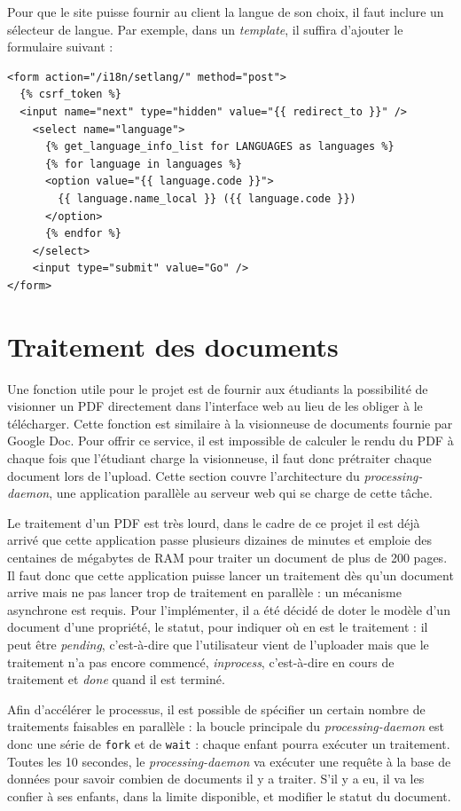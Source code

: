 \documentclass[a4paper,12pt]{article}
\begin{document}
Pour que le site puisse fournir au client la langue de son choix, il faut inclure
un sélecteur de langue. Par exemple, dans un \textit{template}, il suffira d'ajouter
le formulaire suivant : 

\begin{verbatim}
<form action="/i18n/setlang/" method="post">
  {% csrf_token %}
  <input name="next" type="hidden" value="{{ redirect_to }}" />
    <select name="language">
      {% get_language_info_list for LANGUAGES as languages %}
      {% for language in languages %}
      <option value="{{ language.code }}">
        {{ language.name_local }} ({{ language.code }})
      </option>
      {% endfor %}
    </select>
    <input type="submit" value="Go" />
</form>
\end{verbatim}


\section{Traitement des documents}

Une fonction utile pour le projet est de fournir aux étudiants la possibilité
de visionner un PDF directement dans l'interface web au lieu de les obliger
à le télécharger. Cette fonction est similaire à la visionneuse de documents fournie
par Google Doc. Pour offrir ce service, il est impossible de calculer le rendu du PDF
à chaque fois que l'étudiant charge la visionneuse, il faut donc prétraiter chaque
document lors de l'upload. Cette section couvre l'architecture du \textit{processing-daemon},
une application parallèle au serveur web qui se charge de cette tâche.

Le traitement d'un PDF est très lourd, dans le cadre de ce projet il est déjà
arrivé que cette application passe plusieurs dizaines de minutes et emploie des centaines
de mégabytes de RAM pour traiter un document de plus de 200 pages. Il faut
donc que cette application puisse lancer un traitement dès qu'un document arrive
mais ne pas lancer trop de traitement en parallèle : un mécanisme asynchrone est requis.
Pour l'implémenter, il a été décidé de doter le modèle d'un document d'une propriété,
le statut, pour indiquer où en est le traitement : il peut être \textit{pending}, c'est-à-dire
que l'utilisateur vient de l'uploader mais que le traitement n'a pas encore commencé,
\textit{inprocess}, c'est-à-dire en cours de traitement et \textit{done} quand il est terminé.

Afin d'accélérer le processus, il est possible de spécifier un certain
nombre de traitements faisables en parallèle : la boucle principale du \textit{processing-daemon}
est donc une série de \texttt{fork} et de \texttt{wait} : chaque enfant pourra exécuter un traitement.
Toutes les 10 secondes, le \textit{processing-daemon} va exécuter une requête à la base
de données pour savoir combien de documents il y a traiter. S'il y a eu, il va les confier
à ses enfants, dans la limite disponible, et modifier le statut du document.
\end{document}

